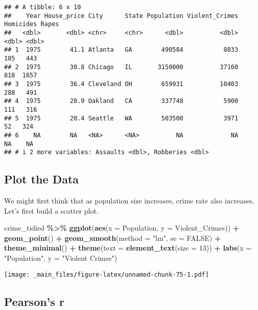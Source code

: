 \documentclass[
]{book}
\newenvironment{Shaded}{\begin{snugshade}}{\end{snugshade}}
\newcommand{\AttributeTok}[1]{\textcolor[rgb]{0.13,0.29,0.53}{#1}}
\newcommand{\ConstantTok}[1]{\textcolor[rgb]{0.56,0.35,0.01}{#1}}
\newcommand{\DecValTok}[1]{\textcolor[rgb]{0.00,0.00,0.81}{#1}}
\newcommand{\FunctionTok}[1]{\textcolor[rgb]{0.13,0.29,0.53}{\textbf{#1}}}
\newcommand{\NormalTok}[1]{#1}
\newcommand{\SpecialCharTok}[1]{\textcolor[rgb]{0.81,0.36,0.00}{\textbf{#1}}}
\newcommand{\StringTok}[1]{\textcolor[rgb]{0.31,0.60,0.02}{#1}}
\begin{document}
\begin{verbatim}
## # A tibble: 6 x 10
##    Year House_price City      State Population Violent_Crimes Homicides Rapes
##   <dbl>       <dbl> <chr>     <chr>      <dbl>          <dbl>     <dbl> <dbl>
## 1  1975        41.1 Atlanta   GA        490584           8033       185   443
## 2  1975        30.8 Chicago   IL       3150000          37160       818  1657
## 3  1975        36.4 Cleveland OH        659931          10403       288   491
## 4  1975        20.9 Oakland   CA        337748           5900       111   316
## 5  1975        20.4 Seattle   WA        503500           3971        52   324
## 6    NA        NA   <NA>      <NA>          NA             NA        NA    NA
## # i 2 more variables: Assaults <dbl>, Robberies <dbl>
\end{verbatim}

\hypertarget{plot-the-data}{%
\subsection{Plot the Data}\label{plot-the-data}}

We might first think that as population size increases, crime rate also increases. Let's first build a scatter plot.

\begin{Shaded}
\begin{Highlighting}[]
\NormalTok{crime\_tidied }\SpecialCharTok{\%\textgreater{}\%}
  \FunctionTok{ggplot}\NormalTok{(}\FunctionTok{aes}\NormalTok{(}\AttributeTok{x =}\NormalTok{ Population, }\AttributeTok{y =}\NormalTok{ Violent\_Crimes)) }\SpecialCharTok{+} 
  \FunctionTok{geom\_point}\NormalTok{() }\SpecialCharTok{+} 
  \FunctionTok{geom\_smooth}\NormalTok{(}\AttributeTok{method =} \StringTok{"lm"}\NormalTok{, }\AttributeTok{se =} \ConstantTok{FALSE}\NormalTok{) }\SpecialCharTok{+}
  \FunctionTok{theme\_minimal}\NormalTok{() }\SpecialCharTok{+}
  \FunctionTok{theme}\NormalTok{(}\AttributeTok{text =} \FunctionTok{element\_text}\NormalTok{(}\AttributeTok{size =} \DecValTok{13}\NormalTok{)) }\SpecialCharTok{+}
  \FunctionTok{labs}\NormalTok{(}\AttributeTok{x =} \StringTok{"Population"}\NormalTok{, }
       \AttributeTok{y =} \StringTok{"Violent Crimes"}\NormalTok{)}
\end{Highlighting}
\end{Shaded}

\texttt{[image: \_main\_files/figure-latex/unnamed-chunk-75-1.pdf]}

\hypertarget{pearsons-r}{%
\subsection{Pearson's r}\label{pearsons-r}}
\end{document}
